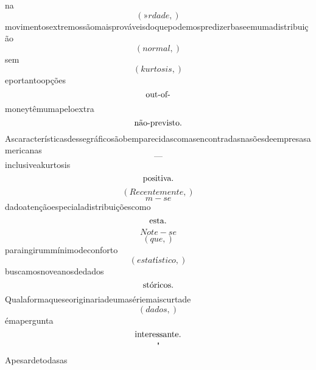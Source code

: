 \documentclass{article}
\begin{document}
\begin{equation}
\end{equation}na\begin{equation}
\left( »rdade,\right)
\end{equation}movimentosextremossãomaisprováveisdoquepodemospredizerbaseemumadistribuição\begin{equation}
\left( normal,\right)
\end{equation}sem\begin{equation}
\left( kurtosis,\right)
\end{equation}eportantoopções\begin{equation}
$out-of-$
\end{equation}moneytêmumapeloextra\begin{equation}
$não-previsto.$
\end{equation}Ascaracterísticasdessegráficosãobemparecidascomasencontradasnasõesdeempresasamericanas\begin{equation}
—
\end{equation}inclusiveakurtosis\begin{equation}
$positiva.$
\end{equation}\begin{equation}
\left( Recentemente,\right)
\end{equation}\begin{equation}
m - se
\end{equation}dadoatençãoespecialadistribuiçõescomo\begin{equation}
$esta.$
\end{equation}\begin{equation}
Note - se
\end{equation}\begin{equation}
\left( que,\right)
\end{equation}paraingirummínimodeconforto\begin{equation}
\left( estatístico,\right)
\end{equation}buscamosnoveanosdedados\begin{equation}
$stóricos.$
\end{equation}Qualaformaqueseoriginariadeumasériemaiscurtade\begin{equation}
\left( dados,\right)
\end{equation}émapergunta\begin{equation}
$interessante.$
\end{equation}\begin{equation}
$"$
\end{equation}Apesardetodasas\begin{equation}

\end{equation}
\end{document}
